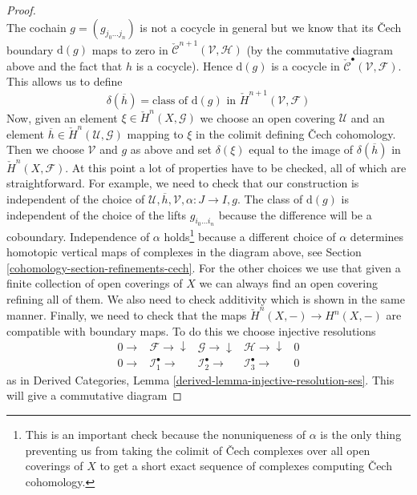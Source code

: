 \begin{proof}
$$$$
The cochain $g = (g_{j_0 \ldots j_n})$ is not a cocycle
in general but we know that its {\v C}ech boundary $\text{d}(g)$
maps to zero in $\check{\mathcal{C}}^{n + 1}(\mathcal{V}, \mathcal{H})$
(by the commutative diagram above and the fact that $h$ is a cocycle).
Hence $\text{d}(g)$ is a cocycle in
$\check{\mathcal{C}}^\bullet(\mathcal{V}, \mathcal{F})$.
This allows us to define
$$
\delta(\overline{h}) = \text{class of }\text{d}(g)\text{ in }
\check{H}^{n + 1}(\mathcal{V}, \mathcal{F})
$$
Now, given an element $\xi \in \check{H}^n(X, \mathcal{G})$
we choose an open covering $\mathcal{U}$ and an element
$\overline{h} \in \check{H}^n(\mathcal{U}, \mathcal{G})$
mapping to $\xi$ in the colimit defining {\v C}ech cohomology.
Then we choose $\mathcal{V}$ and $g$ as above and set
$\delta(\xi)$ equal to the image of $\delta(\overline{h})$
in $\check{H}^n(X, \mathcal{F})$.
At this point a lot of properties have to be checked, all of which
are straightforward. For example, we need to check that our construction
is independent of the choice of
$\mathcal{U}, \overline{h}, \mathcal{V}, \alpha : J \to I, g$.
The class of $\text{d}(g)$ is independent of the choice of the lifts
$g_{i_0 \ldots i_n}$ because the difference will be a coboundary.
Independence of $\alpha$ holds\footnote{This is an important
check because the nonuniqueness of $\alpha$ is the only thing preventing
us from taking the colimit of {\v C}ech complexes over all open
coverings of $X$ to get a short exact sequence of complexes computing
{\v C}ech cohomology.}
because a different choice
of $\alpha$ determines homotopic vertical maps of complexes
in the diagram above, see Section \ref{cohomology-section-refinements-cech}.
For the other choices we use that given a finite collection
of open coverings of $X$ we can always find an open covering refining all
of them. We also need to check additivity which is shown in the same manner.
Finally, we need to check that the maps
$\check{H}^n(X, -) \to H^n(X, -)$ are compatible
with boundary maps. To do this we choose injective
resolutions
$$
\begin{array}{ccccc}0 \longrightarrow & \mathcal{F} \longrightarrow\downarrow & \mathcal{G} \longrightarrow\downarrow & \mathcal{H} \longrightarrow\downarrow & 0 \\ 0 \longrightarrow & \mathcal{I}_1^\bullet \longrightarrow & \mathcal{I}_2^\bullet \longrightarrow & \mathcal{I}_3^\bullet \longrightarrow & 0\end{array}
$$
as in Derived Categories, Lemma \ref{derived-lemma-injective-resolution-ses}.
This will give a commutative diagram

\end{proof}
